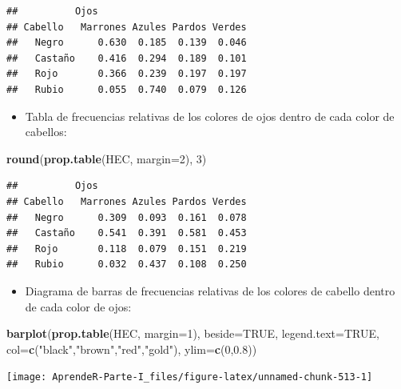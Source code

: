 \documentclass[]{book}
\newenvironment{Shaded}{\begin{snugshade}}{\end{snugshade}}
\newcommand{\DataTypeTok}[1]{\textcolor[rgb]{0.13,0.29,0.53}{#1}}
\newcommand{\DecValTok}[1]{\textcolor[rgb]{0.00,0.00,0.81}{#1}}
\newcommand{\FloatTok}[1]{\textcolor[rgb]{0.00,0.00,0.81}{#1}}
\newcommand{\KeywordTok}[1]{\textcolor[rgb]{0.13,0.29,0.53}{\textbf{#1}}}
\newcommand{\NormalTok}[1]{#1}
\newcommand{\OtherTok}[1]{\textcolor[rgb]{0.56,0.35,0.01}{#1}}
\newcommand{\StringTok}[1]{\textcolor[rgb]{0.31,0.60,0.02}{#1}}
\providecommand{\tightlist}{%
  \setlength{\itemsep}{0pt}\setlength{\parskip}{0pt}}
\theoremstyle{definition}
\theoremstyle{definition}
\theoremstyle{definition}
\theoremstyle{remark}
\begin{document}
\begin{verbatim}
##          Ojos
## Cabello   Marrones Azules Pardos Verdes
##   Negro      0.630  0.185  0.139  0.046
##   Castaño    0.416  0.294  0.189  0.101
##   Rojo       0.366  0.239  0.197  0.197
##   Rubio      0.055  0.740  0.079  0.126
\end{verbatim}

\begin{itemize}
\tightlist
\item
  Tabla de frecuencias relativas de los colores de ojos dentro de cada color de cabellos:
\end{itemize}

\begin{Shaded}
\begin{Highlighting}[]
\KeywordTok{round}\NormalTok{(}\KeywordTok{prop.table}\NormalTok{(HEC, }\DataTypeTok{margin=}\DecValTok{2}\NormalTok{), }\DecValTok{3}\NormalTok{)   }
\end{Highlighting}
\end{Shaded}

\begin{verbatim}
##          Ojos
## Cabello   Marrones Azules Pardos Verdes
##   Negro      0.309  0.093  0.161  0.078
##   Castaño    0.541  0.391  0.581  0.453
##   Rojo       0.118  0.079  0.151  0.219
##   Rubio      0.032  0.437  0.108  0.250
\end{verbatim}

\begin{itemize}
\tightlist
\item
  Diagrama de barras de frecuencias relativas de los colores de cabello dentro de cada color de ojos:
\end{itemize}

\begin{Shaded}
\begin{Highlighting}[]
\KeywordTok{barplot}\NormalTok{(}\KeywordTok{prop.table}\NormalTok{(HEC, }\DataTypeTok{margin=}\DecValTok{1}\NormalTok{), }\DataTypeTok{beside=}\OtherTok{TRUE}\NormalTok{, }\DataTypeTok{legend.text=}\OtherTok{TRUE}\NormalTok{,}
   \DataTypeTok{col=}\KeywordTok{c}\NormalTok{(}\StringTok{"black"}\NormalTok{,}\StringTok{"brown"}\NormalTok{,}\StringTok{"red"}\NormalTok{,}\StringTok{"gold"}\NormalTok{), }\DataTypeTok{ylim=}\KeywordTok{c}\NormalTok{(}\DecValTok{0}\NormalTok{,}\FloatTok{0.8}\NormalTok{))}
\end{Highlighting}
\end{Shaded}

\begin{center}\texttt{[image: AprendeR-Parte-I\_files/figure-latex/unnamed-chunk-513-1]} \end{center}
\end{document}
